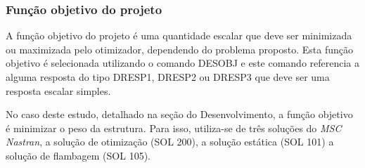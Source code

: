 \subsubsection{Função objetivo do projeto}
A função objetivo do projeto é uma quantidade escalar que deve ser minimizada ou maximizada pelo otimizador, dependendo do problema proposto. Esta função objetivo é selecionada utilizando o comando DESOBJ e este comando referencia a alguma resposta do tipo DRESP1, DRESP2 ou DRESP3 que deve ser uma resposta escalar simples.

No caso deste estudo, detalhado na seção do Desenvolvimento, a função objetivo é minimizar o peso da estrutura. Para isso, utiliza-se de três soluções do \emph{MSC Nastran}, a solução de otimização (SOL 200), a solução estática (SOL 101) a solução de flambagem (SOL 105). 
